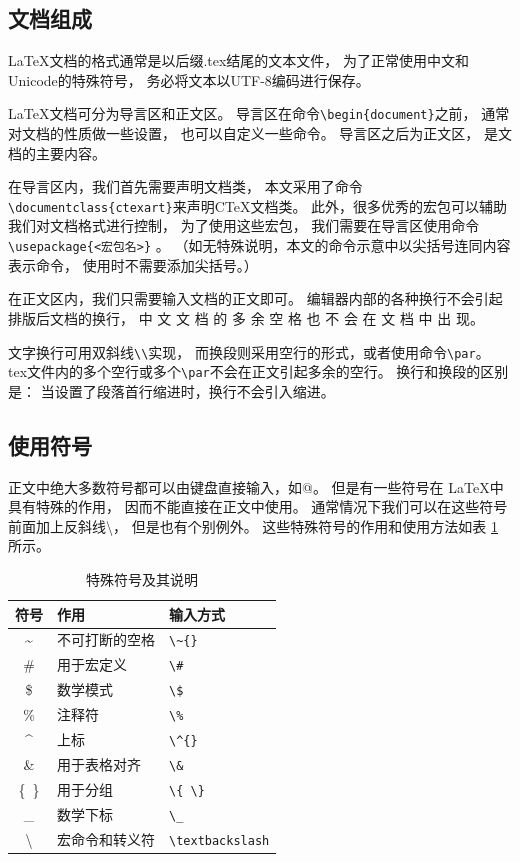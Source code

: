 \documentclass{ctexart}
\numberwithin{equation}{section}			%
\begin{document}
	\subsection{文档组成}
	\LaTeX 文档的格式通常是以后缀.tex结尾的文本文件，
	为了正常使用中文和Unicode的特殊符号，
	务必将文本以UTF-8编码进行保存。
	
	\LaTeX 文档可分为导言区和正文区。
	导言区在命令\verb|\begin{document}|之前，
	通常对文档的性质做一些设置，
	也可以自定义一些命令。
	导言区之后为正文区，
	是文档的主要内容。
	
	在导言区内，我们首先需要声明文档类，
	本文采用了命令\verb|\documentclass{ctexart}|来声明C\TeX 文档类。
	此外，很多优秀的宏包可以辅助我们对文档格式进行控制，
	为了使用这些宏包，
	我们需要在导言区使用命令\verb|\usepackage{<宏包名>}| 。
	（如无特殊说明，本文的命令示意中以尖括号连同内容表示命令，
	使用时不需要添加尖括号。）
	
	在正文区内，我们只需要输入文档的正文即可。
	编辑器内部的各种换行不会引起排版后文档的换行，
	中 文 文 档 的 多 余 空 格 也 不 会 在 文 档 中 出 现。 \par
	文字换行可用双斜线\verb|\\|实现，
	而换段则采用空行的形式，或者使用命令\verb|\par|。
	tex文件内的多个空行或多个\verb|\par|不会在正文引起多余的空行。
	换行和换段的区别是：
	当设置了段落首行缩进时，换行不会引入缩进。
	
	\subsection{使用符号}
	正文中绝大多数符号都可以由键盘直接输入，如@。
	但是有一些符号在 \LaTeX 中具有特殊的作用，
	因而不能直接在正文中使用。
	通常情况下我们可以在这些符号前面加上反斜线\textbackslash，
	但是也有个别例外。
	这些特殊符号的作用和使用方法如表 \ref{tab:symbol} 所示。
	
	\begin{table}
		\centering
		\caption{特殊符号及其说明}
		\label{tab:symbol}
		\begin{tabular}{cll}
			\toprule
			符号 & 作用 & 输入方式\\
			\midrule
			\~{} & 不可打断的空格 & \verb|\~{}| \\
			\# & 用于宏定义 & \verb|\#| \\
			\$ & 数学模式 & \verb|\$| \\
			\% & 注释符 & \verb|\%| \\
			\^{} & 上标 & \verb|\^{}| \\
			\& & 用于表格对齐 & \verb|\&| \\
			\{\ \} & 用于分组 & \verb|\{ \}| \\
			\_ & 数学下标 & \verb|\_| \\
			\textbackslash & 宏命令和转义符 & \verb|\textbackslash| \\
			\bottomrule
		\end{tabular}
	\end{table}
	
\end{document}
